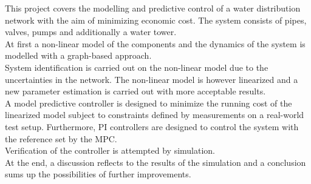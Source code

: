 


This project covers the modelling and predictive control of a water distribution network with the aim of minimizing economic cost. The system consists of pipes, valves, pumps and additionally a water tower.\\
At first a non-linear model of the components and the dynamics of the system is modelled with a graph-based approach.\\ 
System identification is carried out on the non-linear model due to the uncertainties in the network. The non-linear model is however linearized and a new parameter estimation is carried out with more acceptable results. \\
A model predictive controller is designed to minimize the running cost of the linearized model subject to constraints defined by measurements on a real-world test setup. Furthermore, PI controllers are designed to control the system with the reference set by the MPC. \\
Verification of the controller is attempted by simulation.\\
At the end, a discussion reflects to the results of the simulation and a conclusion sums up the possibilities of further improvements. 





